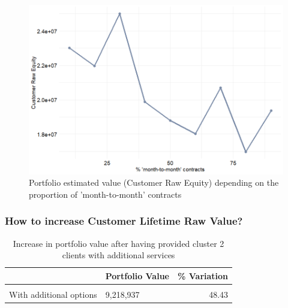 \documentclass[
]{book}
\begin{document}
\begin{figure}

{\centering \includegraphics[width=12.5in]{./imgs/portVal_month_to_month} 

}

\caption{Portfolio estimated value (Customer Raw Equity) depending on the proportion of 'month-to-month' contracts}\label{fig:clrvmonthtomonthEvol}
\end{figure}

\hypertarget{how-to-increase-customer-lifetime-raw-value}{%
\subsubsection*{How to increase Customer Lifetime Raw Value?}\label{how-to-increase-customer-lifetime-raw-value}}

\begin{table}[H]

\caption{\label{tab:unnamed-chunk-32}Increase in portfolio value after having provided cluster 2 clients with additional services}
\centering
\begin{tabular}[t]{llr}
\toprule
  & Portfolio Value & \% Variation\\
\midrule
\cellcolor{gray!6}{Reference} & \cellcolor{gray!6}{6,211,027} & \cellcolor{gray!6}{0.00}\\
With additional options & 9,218,937 & 48.43\\
\bottomrule
\end{tabular}
\end{table}
\end{document}
